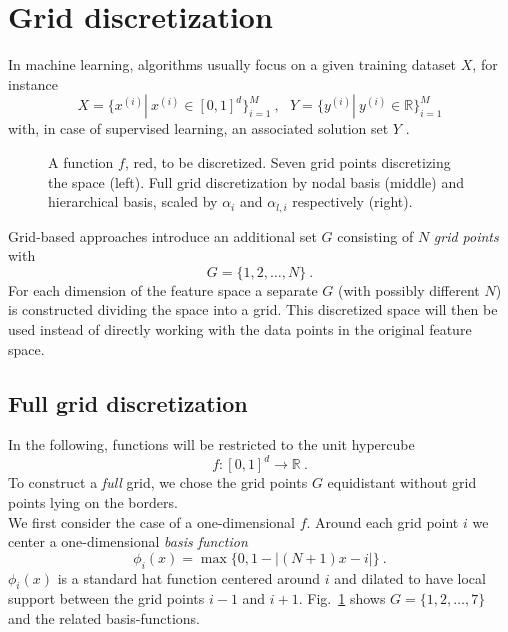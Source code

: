 \section{Grid discretization}\label{sec:grid}

In machine learning, algorithms usually focus on a given training dataset
$X$, for instance
$$ X = \{x^{(i)} | \ x^{(i)} \in [0, 1]^d\}_{i = 1}^M \ , \ \ \
Y = \{y^{(i)} | \ y^{(i)} \in \mathbb{R}\}_{i=1}^M$$
with, in case of supervised learning, an associated solution set $Y$
\cite{artbunshort}.

\par

\begin{figure}[t!]
  \centering
  
  
  
  \caption{A function $f$, red, to be discretized.
    Seven grid points discretizing the space
    (left). Full grid discretization by nodal basis (middle) and
    hierarchical basis, scaled by $\alpha_i$ and $\alpha_{l,i}$
    respectively (right).\label{fig:fig1}}
\end{figure}

Grid-based approaches introduce an additional set $G$ consisting of $N$
\emph{grid points} with
$$ G = \{1,2,\dots,N\} \ .$$
For each dimension of the feature space a separate $G$ (with possibly
different $N$) is constructed dividing the space into a grid.
This discretized space
will then be used instead of directly working with the data points in the original
feature space.

\subsection{Full grid discretization}\label{subsec:fullgrid}
In the following, functions
will be restricted to the unit hypercube
 $$ f: [0, 1]^d \rightarrow \mathbb{R} \ .$$
To construct a \emph{full} grid, we chose the grid points $G$ equidistant
without grid points lying on the borders. \\
We first consider the case of a one-dimensional $f$.
Around each grid point $i$ we center a one-dimensional
\emph{basis function}
$$ \phi_i(x) = \max\{0, 1 - |(N + 1)x - i|\} \ .$$
$\phi_i(x)$ is a standard hat function centered around $i$ and dilated
to have local support between the grid points $i - 1$ and $i + 1$. Fig.~\ref{fig:fig1}
shows $G = \{1,2,\dots,7\}$ and the related basis-functions.

